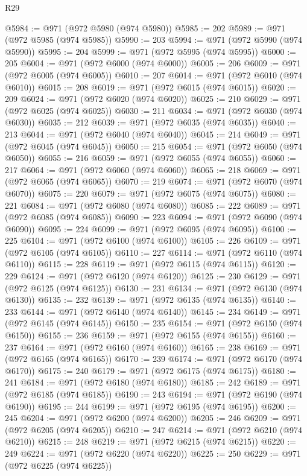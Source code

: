 \begin{lexlean}{R29}
\begin{coremodule}
@5984 := @971 (@972 @5980 (@974 @5980))
@5985 := 202
@5989 := @971 (@972 @5985 (@974 @5985))
@5990 := 203
@5994 := @971 (@972 @5990 (@974 @5990))
@5995 := 204
@5999 := @971 (@972 @5995 (@974 @5995))
@6000 := 205
@6004 := @971 (@972 @6000 (@974 @6000))
@6005 := 206
@6009 := @971 (@972 @6005 (@974 @6005))
@6010 := 207
@6014 := @971 (@972 @6010 (@974 @6010))
@6015 := 208
@6019 := @971 (@972 @6015 (@974 @6015))
@6020 := 209
@6024 := @971 (@972 @6020 (@974 @6020))
@6025 := 210
@6029 := @971 (@972 @6025 (@974 @6025))
@6030 := 211
@6034 := @971 (@972 @6030 (@974 @6030))
@6035 := 212
@6039 := @971 (@972 @6035 (@974 @6035))
@6040 := 213
@6044 := @971 (@972 @6040 (@974 @6040))
@6045 := 214
@6049 := @971 (@972 @6045 (@974 @6045))
@6050 := 215
@6054 := @971 (@972 @6050 (@974 @6050))
@6055 := 216
@6059 := @971 (@972 @6055 (@974 @6055))
@6060 := 217
@6064 := @971 (@972 @6060 (@974 @6060))
@6065 := 218
@6069 := @971 (@972 @6065 (@974 @6065))
@6070 := 219
@6074 := @971 (@972 @6070 (@974 @6070))
@6075 := 220
@6079 := @971 (@972 @6075 (@974 @6075))
@6080 := 221
@6084 := @971 (@972 @6080 (@974 @6080))
@6085 := 222
@6089 := @971 (@972 @6085 (@974 @6085))
@6090 := 223
@6094 := @971 (@972 @6090 (@974 @6090))
@6095 := 224
@6099 := @971 (@972 @6095 (@974 @6095))
@6100 := 225
@6104 := @971 (@972 @6100 (@974 @6100))
@6105 := 226
@6109 := @971 (@972 @6105 (@974 @6105))
@6110 := 227
@6114 := @971 (@972 @6110 (@974 @6110))
@6115 := 228
@6119 := @971 (@972 @6115 (@974 @6115))
@6120 := 229
@6124 := @971 (@972 @6120 (@974 @6120))
@6125 := 230
@6129 := @971 (@972 @6125 (@974 @6125))
@6130 := 231
@6134 := @971 (@972 @6130 (@974 @6130))
@6135 := 232
@6139 := @971 (@972 @6135 (@974 @6135))
@6140 := 233
@6144 := @971 (@972 @6140 (@974 @6140))
@6145 := 234
@6149 := @971 (@972 @6145 (@974 @6145))
@6150 := 235
@6154 := @971 (@972 @6150 (@974 @6150))
@6155 := 236
@6159 := @971 (@972 @6155 (@974 @6155))
@6160 := 237
@6164 := @971 (@972 @6160 (@974 @6160))
@6165 := 238
@6169 := @971 (@972 @6165 (@974 @6165))
@6170 := 239
@6174 := @971 (@972 @6170 (@974 @6170))
@6175 := 240
@6179 := @971 (@972 @6175 (@974 @6175))
@6180 := 241
@6184 := @971 (@972 @6180 (@974 @6180))
@6185 := 242
@6189 := @971 (@972 @6185 (@974 @6185))
@6190 := 243
@6194 := @971 (@972 @6190 (@974 @6190))
@6195 := 244
@6199 := @971 (@972 @6195 (@974 @6195))
@6200 := 245
@6204 := @971 (@972 @6200 (@974 @6200))
@6205 := 246
@6209 := @971 (@972 @6205 (@974 @6205))
@6210 := 247
@6214 := @971 (@972 @6210 (@974 @6210))
@6215 := 248
@6219 := @971 (@972 @6215 (@974 @6215))
@6220 := 249
@6224 := @971 (@972 @6220 (@974 @6220))
@6225 := 250
@6229 := @971 (@972 @6225 (@974 @6225))

\end{coremodule}
\end{lexlean}
